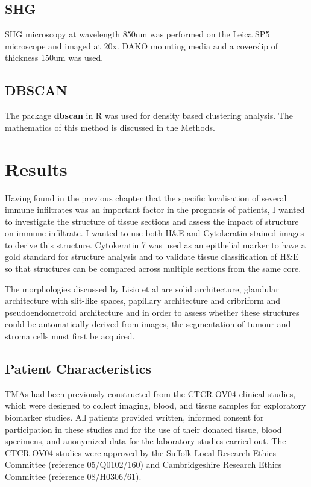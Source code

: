 \subsection{SHG}
SHG microscopy at wavelength 850nm was performed on the Leica SP5 microscope and imaged at 20x. DAKO mounting media and a coverslip of thickness 150um was used. 

\subsection{DBSCAN}
The package \textbf{dbscan} in R was used for density based clustering analysis. The mathematics of this method is discussed in the Methods. 

\section{Results}
Having found in the previous chapter that the specific localisation of several immune infiltrates was an important factor in the prognosis of patients, I wanted to investigate the structure of tissue sections and assess the impact of structure on immune infiltrate. I wanted to use both H&E and Cytokeratin stained images to derive this structure. Cytokeratin 7 was used as an epithelial marker to have a gold standard for structure analysis and to validate tissue classification of H\&E so that structures can be compared across multiple sections from the same core.

The morphologies discussed by Lisio et al are solid architecture, glandular architecture with slit-like spaces, papillary architecture and cribriform and pseudoendometroid architecture\cite{Lisio2019Feb} and in order to assess whether these structures could be automatically derived from images, the segmentation of tumour and stroma cells must first be acquired. 

\subsection{Patient Characteristics}
TMAs had been previously constructed from the CTCR-OV04 clinical studies, which were designed to collect imaging, blood, and tissue samples for exploratory biomarker studies. All patients provided written, informed consent for participation in these studies and for the use of their donated tissue, blood specimens, and anonymized data for the laboratory studies carried out. The CTCR-OV04 studies were approved by the Suffolk Local Research Ethics Committee (reference 05/Q0102/160) and Cambridgeshire Research Ethics Committee (reference 08/H0306/61).\cite{}

